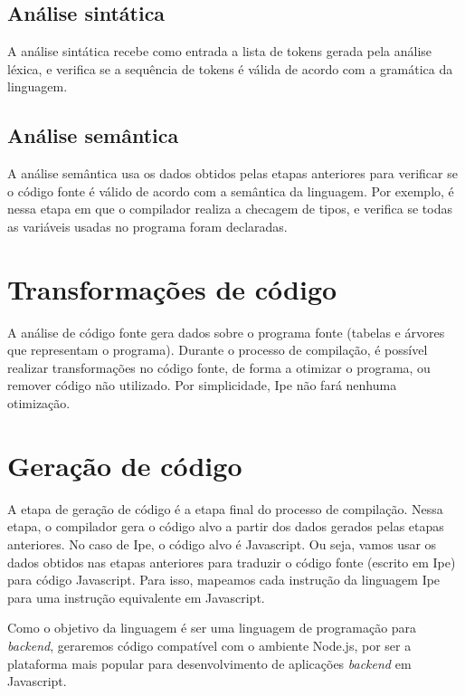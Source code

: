 \subsection{Análise sintática}

A análise sintática recebe como entrada a lista de tokens gerada pela análise
léxica, e verifica se a sequência de tokens é válida de acordo com a gramática da
linguagem.

\subsection{Análise semântica}

A análise semântica usa os dados obtidos pelas etapas anteriores para verificar se
o código fonte é válido de acordo com a semântica da linguagem. Por exemplo, é
nessa etapa em que o compilador realiza a checagem de tipos, e verifica se todas
as variáveis usadas no programa foram declaradas.


\section{Transformações de código}

A análise de código fonte gera dados sobre o programa fonte (tabelas e árvores que
representam o programa). Durante o processo de compilação, é possível realizar
transformações no código fonte, de forma a otimizar o programa, ou remover código
não utilizado. Por simplicidade, Ipe não fará nenhuma otimização.


\section{Geração de código}

A etapa de geração de código é a etapa final do processo de compilação. Nessa
etapa, o compilador gera o código alvo a partir dos dados gerados pelas etapas
anteriores. No caso de Ipe, o código alvo é Javascript. Ou seja, vamos usar os dados
obtidos nas etapas anteriores para traduzir o código fonte (escrito em Ipe) para
código Javascript. Para isso, mapeamos cada instrução da linguagem Ipe para uma
instrução equivalente em Javascript.

Como o objetivo da linguagem é ser uma linguagem de programação para \textit{backend},
geraremos código compatível com o ambiente Node.js, por ser a plataforma mais popular
para desenvolvimento de aplicações \textit{backend} em Javascript.
